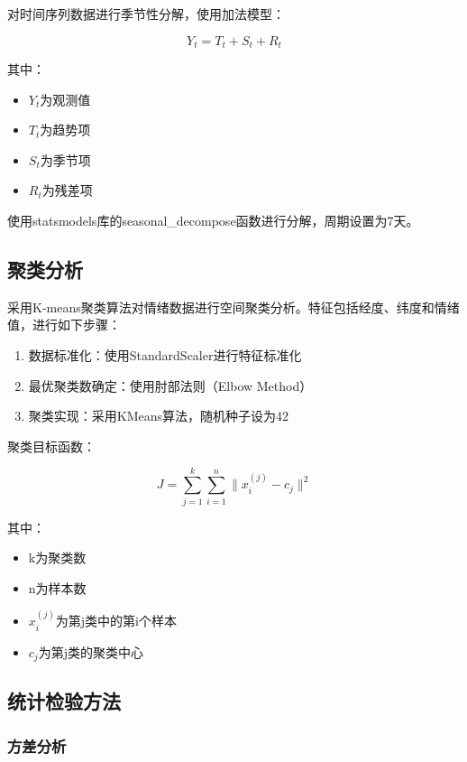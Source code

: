 \documentclass[12pt,a4paper]{article}
\begin{document}
对时间序列数据进行季节性分解，使用加法模型：

\begin{equation}
Y_t = T_t + S_t + R_t
\end{equation}

其中：
\begin{itemize}
\item $Y_t$为观测值
\item $T_t$为趋势项
\item $S_t$为季节项
\item $R_t$为残差项
\end{itemize}

使用statsmodels库的seasonal\_decompose函数进行分解，周期设置为7天。

\subsection{聚类分析}

采用K-means聚类算法对情绪数据进行空间聚类分析。特征包括经度、纬度和情绪值，进行如下步骤：

\begin{enumerate}
\item 数据标准化：使用StandardScaler进行特征标准化
\item 最优聚类数确定：使用肘部法则（Elbow Method）
\item 聚类实现：采用KMeans算法，随机种子设为42
\end{enumerate}

聚类目标函数：

\begin{equation}
J = \sum_{j=1}^k \sum_{i=1}^n \|x_i^{(j)} - c_j\|^2
\end{equation}

其中：
\begin{itemize}
\item k为聚类数
\item n为样本数
\item $x_i^{(j)}$为第j类中的第i个样本
\item $c_j$为第j类的聚类中心
\end{itemize}

\subsection{统计检验方法}

\subsubsection{方差分析}
\end{document}
